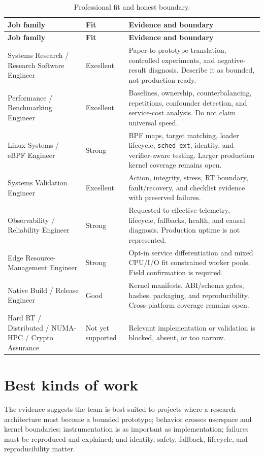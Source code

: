 \documentclass[11pt,a4paper,oneside]{report}
\newcommand{\schedext}{\texttt{sched\_ext}}
\begin{document}
\begin{longtable}{@{}p{46mm}C{20mm}p{83mm}@{}}
\caption{Professional fit and honest boundary.}\label{tab:jobs}\\
\toprule
\textbf{Job family} & \textbf{Fit} & \textbf{Evidence and boundary} \\
\midrule
\endfirsthead
\toprule
\textbf{Job family} & \textbf{Fit} & \textbf{Evidence and boundary} \\
\midrule
\endhead
Systems Research / Research Software Engineer & Excellent & Paper-to-prototype
translation, controlled experiments, and negative-result diagnosis. Describe it
as bounded, not production-ready. \\
Performance / Benchmarking Engineer & Excellent & Baselines, ownership,
counterbalancing, repetitions, confounder detection, and service-cost analysis.
Do not claim universal speed. \\
Linux Systems / eBPF Engineer & Strong & BPF maps, target matching, loader
lifecycle, \schedext{}, identity, and verifier-aware testing. Larger production
kernel coverage remains open. \\
Systems Validation Engineer & Excellent & Action, integrity, stress, RT
boundary, fault/recovery, and checklist evidence with preserved failures. \\
Observability / Reliability Engineer & Strong & Requested-to-effective
telemetry, lifecycle, fallbacks, health, and causal diagnosis. Production uptime
is not represented. \\
Edge Resource-Management Engineer & Strong & Opt-in service differentiation
and mixed CPU/I/O fit constrained worker pools. Field confirmation is required. \\
Native Build / Release Engineer & Good & Kernel manifests, ABI/schema gates,
hashes, packaging, and reproducibility. Cross-platform coverage remains open. \\
Hard RT / Distributed / NUMA-HPC / Crypto Assurance & Not yet supported &
Relevant implementation or validation is blocked, absent, or too narrow. \\
\bottomrule
\end{longtable}

\section{Best kinds of work}

The evidence suggests the team is best suited to projects where a research
architecture must become a bounded prototype; behavior crosses userspace and
kernel boundaries; instrumentation is as important as implementation; failures
must be reproduced and explained; and identity, safety, fallback, lifecycle,
and reproducibility matter.
\end{document}
